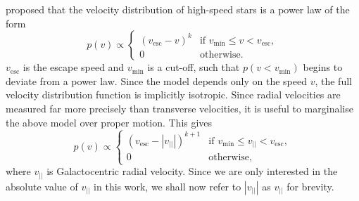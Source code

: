 \documentclass[useAMS,twocolumn,usenatbib]{mn2e}
\def\vlos{{v_{||}}}
\def\vesc{{v_\mathrm{esc}}}
\def\vmin{{v_\mathrm{min}}}
\begin{document}
\cite{Le90} proposed that the velocity distribution of 
high-speed stars is a power law of the form
%
\begin{equation}
  p(v)\propto\begin{cases}
    (\vesc - v)^k & \text{if $\vmin \leq v<\vesc$},\\
    0 & \text{otherwise}.
  \end{cases}
  \label{eq:lt90}
\end{equation}
%
$\vesc$ is the escape speed and $\vmin$ is a cut-off, 
such that $p(v < \vmin)$ begins to deviate from a power 
law. Since the model depends only on the speed $v$, 
the full velocity distribution function is implicitly 
isotropic. Since radial velocities are measured far more precisely 
than transverse velocities, it is useful to marginalise 
the above model over proper motion. This gives
%
\begin{equation}
  p(v)\propto\begin{cases}
    (\vesc - |\vlos|)^{k+1} & \text{if $\vmin \leq \vlos <\vesc$},\\
    0 & \text{otherwise},
  \end{cases}
\end{equation}
%
where $\vlos$ is Galactocentric radial velocity. Since we are only interested 
in the absolute value of $\vlos$ in this work, we shall 
now refer to $|\vlos|$ as $\vlos$ for brevity. 
\end{document}
